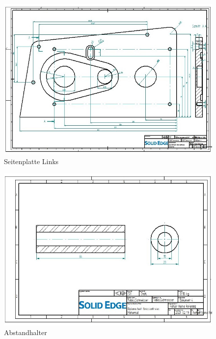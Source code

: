 \begin{figure} [H]
	\begin{center}
		\includegraphics[angle=90]{figures/mechanik/Seitenplatte_Fertigung_Links.jpg}
			\caption{Seitenplatte Links}
			\label{fig:Seitenplatte Links}
	\end{center}
\end{figure}


\begin{figure} [H]
	\begin{center}
		\includegraphics[angle=90]{figures/mechanik/Seitenplatte_Abstandhalter_Zeichnung.jpg}
			\caption{Abstandhalter}
			\label{fig:Abstandhalter}
	\end{center}
\end{figure}


